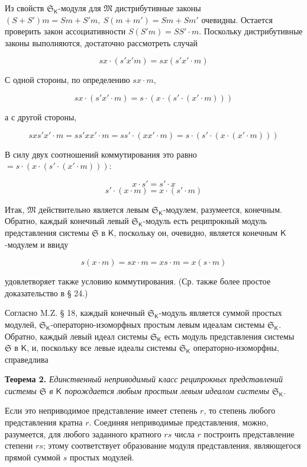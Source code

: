 \documentclass[11pt]{article}
\begin{document}
Из свойств \(\mathfrak S_{\mathsf K}\)-модуля для \(\mathfrak M\) дистрибутивные законы \((S+S')m=Sm+S'm,\ S(m+m')=Sm+Sm'\) очевидны. Остается проверить закон ассоциативности \(S(S'm)=SS'\cdot m\). Поскольку дистрибутивные законы выполняются, достаточно рассмотреть случай

\[
sx\cdot(s'x' m)=sx(s'x'\cdot m)
\]

С одной стороны, по определению \(sx\cdot m\),

\[
sx\cdot(s'x'\cdot m)=s\cdot(x\cdot(s'\cdot(x'\cdot m)))
\]

а с другой стороны,

\[
sx s'x'\cdot m=ss'xx'\cdot m=ss'\cdot(xx'\cdot m)
=s\cdot(s'\cdot(x\cdot(x'\cdot m)))
\]

В силу двух соотношений коммутирования это равно \(=s\cdot(x\cdot(s'\cdot(x'\cdot m)))\):

\[
x\cdot s'=s'\cdot x
\]
\[
s'\cdot(x\cdot m)=x\cdot(s'\cdot m)
\]

Итак, \(\mathfrak M\) действительно является левым \(\mathfrak S_{\mathsf K}\)-модулем, разумеется, конечным. Обратно, каждый конечный левый \(\mathfrak S_{\mathsf K}\)-модуль есть реципрокный модуль представления системы \(\mathfrak S\) в \(\mathsf K\), поскольку он, очевидно, является конечным \(\mathsf K\)-модулем и ввиду

\[
s(x\cdot m)=sx\cdot m=xs\cdot m=x(s\cdot m)
\]

удовлетворяет также условию коммутирования. (Ср. также более простое доказательство в § 24.)

Согласно M.Z. § 18, каждый конечный \(\mathfrak S_{\mathsf K}\)-модуль является суммой простых модулей, \(\mathfrak S_{\mathsf K}\)-операторно-изоморфных простым левым идеалам системы \(\mathfrak S_{\mathsf K}\). Обратно, каждый левый идеал системы \(\mathfrak S_{\mathsf K}\) есть модуль представления системы \(\mathfrak S\) в \(\mathsf K\), и, поскольку все левые идеалы системы \(\mathfrak S_{\mathsf K}\) операторно-изоморфны, справедлива

\textbf{Теорема 2.} \emph{Единственный неприводимый класс реципрокных представлений системы \(\mathfrak S\) в \(\mathsf K\) порождается любым простым левым идеалом системы \(\mathfrak S_{\mathsf K}\).}

Если это неприводимое представление имеет степень \(r\), то степень любого представления кратна \(r\). Соединяя неприводимые представления, можно, разумеется, для любого заданного кратного \(rs\) числа \(r\) построить представление степени \(rs\); этому соответствует образование модуля представления, являющегося прямой суммой \(s\) простых модулей.
\end{document}

